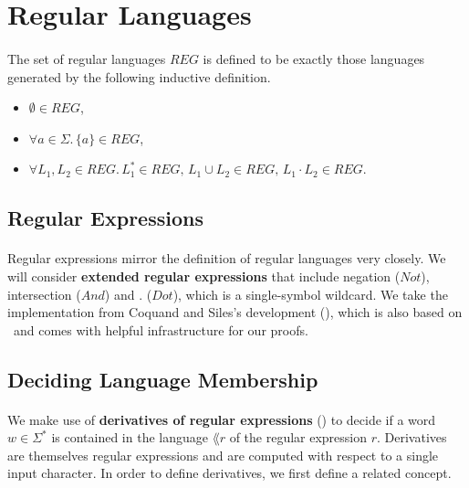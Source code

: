 \documentclass[11pt,a4paper,oneside]{book}
\begin{document}
        \section{Regular Languages}
        
    
            \paragraph{}
            The set of regular languages $REG$ is defined to be exactly those languages generated by the following inductive definition.
            \begin{itemize}
                \item
                    $\emptyset \in REG$, 
                \item
                    $\forall a \in \Sigma. \, \{a\} \in REG$, 
                \item
                    $\forall L_1, L_2 \in REG. \, L_1^* \in REG, \, L_1 \cup L_2 \in REG, \, L_1 \cdot L_2 \in REG$.
            \end{itemize}


        \subsection{Regular Expressions}

                \paragraph{} 
                Regular expressions mirror the definition of regular languages very closely. 
                We will consider \textbf{extended regular expressions} that include negation ($Not$), intersection ($And$) and $.$ ($Dot$), which is a single-symbol wildcard. 
                We take the implementation from Coquand and Siles's development (\cite{DBLP:conf/cpp/CoquandS11}), which is also based on \ssreflect\ and comes with helpful infrastructure for our proofs.


                \subsection{Deciding Language Membership}
                    \paragraph{}
                        We make use of \textbf{derivatives of regular expressions} (\cite{DBLP:journals/jacm/Brzozowski64}) to decide if a word $w \in \Sigma^*$ is contained in the language $\lang{r}$ of the regular expression $r$. 
                        Derivatives are themselves regular expressions and are computed with respect to a single input character. 
                        In order to define derivatives, we first define a related concept.
\end{document}
